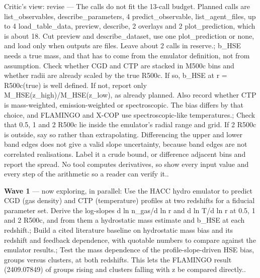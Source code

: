 \documentclass[11pt,a4paper]{article}
\begin{document}
\begin{enumerate}
Critic's view: revise --- The calls do not fit the 13-call budget. Planned calls are list\_observables, describe\_parameters, 4 predict\_observable, list\_agent\_files, up to 4 load\_table\_data, preview, describe, 2 overlays and 2 plot\_prediction, which is about 18. Cut preview and describe\_dataset, use one plot\_prediction or none, and load only when outputs are files. Leave about 2 calls in reserve.; b\_HSE needs a true mass, and that has to come from the emulator definition, not from assumption. Check whether CGD and CTP are stacked in M500c bins and whether radii are already scaled by the true R500c. If so, b\_HSE at r = R500c(true) is well defined. If not, report only M\_HSE(z\_high)/M\_HSE(z\_low), as already planned. Also record whether CTP is mass-weighted, emission-weighted or spectroscopic. The bias differs by that choice, and FLAMINGO and X-COP use spectroscopic-like temperatures.; Check that 0.5, 1 and 2 R500c lie inside the emulator's radial range and grid. If 2 R500c is outside, say so rather than extrapolating. Differencing the upper and lower band edges does not give a valid slope uncertainty, because band edges are not correlated realisations. Label it a crude bound, or difference adjacent bins and report the spread. No tool computes derivatives, so show every input value and every step of the arithmetic so a reader can verify it..

\end{enumerate}
\textbf{Wave 1} --- now exploring, in parallel: Use the HACC hydro emulator to predict CGD (gas density) and CTP (temperature) profiles at two redshifts for a fiducial parameter set. Derive the log-slopes d ln n\_gas/d ln r and d ln T/d ln r at 0.5, 1 and 2 R500c, and from them a hydrostatic mass estimate and b\_HSE at each redshift.; Build a cited literature baseline on hydrostatic mass bias and its redshift and feedback dependence, with quotable numbers to compare against the emulator results.; Test the mass dependence of the profile-slope-driven HSE bias, groups versus clusters, at both redshifts. This lets the FLAMINGO result (2409.07849) of groups rising and clusters falling with z be compared directly..
\end{document}
